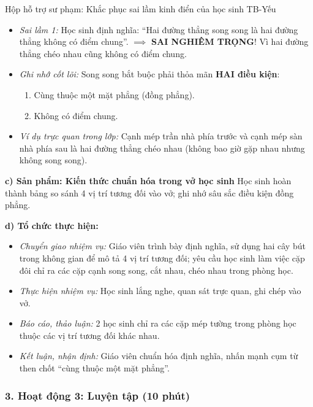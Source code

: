 \documentclass[12pt, a4paper]{article}
\begin{document}
\begin{scaffoldbox}{Hộp hỗ trợ sư phạm: Khắc phục sai lầm kinh điển của học sinh TB-Yếu}
\begin{itemize}[leftmargin=0.6cm]
    \item \textit{Sai lầm 1:} Học sinh định nghĩa: ``Hai đường thẳng song song là hai đường thẳng không có điểm chung''. $\implies$ \textbf{SAI NGHIÊM TRỌNG}! Vì hai đường thẳng chéo nhau cũng không có điểm chung.
    \item \textit{Ghi nhớ cốt lõi:} Song song bắt buộc phải thỏa mãn \textbf{HAI điều kiện}:
    \begin{enumerate}[leftmargin=0.6cm]
        \item Cùng thuộc một mặt phẳng (đồng phẳng).
        \item Không có điểm chung.
    \end{enumerate}
    \item \textit{Ví dụ trực quan trong lớp:} Cạnh mép trần nhà phía trước và cạnh mép sàn nhà phía sau là hai đường thẳng chéo nhau (không bao giờ gặp nhau nhưng không song song).
\end{itemize}
\end{scaffoldbox}

\noindent \textbf{c) Sản phẩm: Kiến thức chuẩn hóa trong vở học sinh}
Học sinh hoàn thành bảng so sánh 4 vị trí tương đối vào vở; ghi nhớ sâu sắc điều kiện đồng phẳng.

\noindent \textbf{d) Tổ chức thực hiện:}
\begin{itemize}[leftmargin=0.8cm]
    \item \textit{Chuyển giao nhiệm vụ:} Giáo viên trình bày định nghĩa, sử dụng hai cây bút trong không gian để mô tả 4 vị trí tương đối; yêu cầu học sinh làm việc cặp đôi chỉ ra các cặp cạnh song song, cắt nhau, chéo nhau trong phòng học.
    \item \textit{Thực hiện nhiệm vụ:} Học sinh lắng nghe, quan sát trực quan, ghi chép vào vở.
    \item \textit{Báo cáo, thảo luận:} 2 học sinh chỉ ra các cặp mép tường trong phòng học thuộc các vị trí tương đối khác nhau.
    \item \textit{Kết luận, nhận định:} Giáo viên chuẩn hóa định nghĩa, nhấn mạnh cụm từ then chốt ``cùng thuộc một mặt phẳng''.
\end{itemize}

\subsubsection*{3. Hoạt động 3: Luyện tập (10 phút)}
\end{document}

